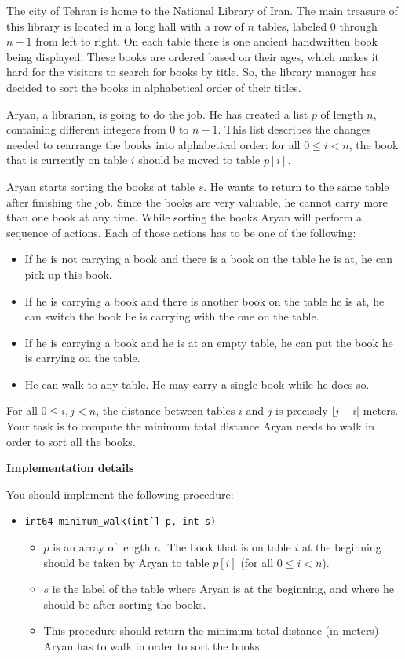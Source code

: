 The city of Tehran is home to the National Library of Iran.
The main treasure of this library is located in a long hall with a row of $n$ tables, labeled $0$ through $n-1$ from left to right.
On each table there is one ancient handwritten book being displayed.
These books are ordered based on their ages, which makes it hard for the visitors to search for books by title.
So, the library manager has decided to sort the books in alphabetical order of their titles.

Aryan, a librarian, is going to do the job.
He has created a list $p$ of length $n$, containing different integers from $0$ to $n-1$.
This list describes the changes needed to rearrange the books into alphabetical order:
for all $0 \le i < n$, the book that is currently on table $i$ should be moved to table $p[i]$.

Aryan starts sorting the books at table $s$.
He wants to return to the same table after finishing the job.
Since the books are very valuable, he cannot carry more than one book at any time.
While sorting the books Aryan will perform a sequence of actions.
Each of those actions has to be one of the following:
\begin{itemize}
\item If he is not carrying a book and there is a book on the table he is at, he can pick up this book.
\item If he is carrying a book and there is another book on the table he is at, he can switch the book he is carrying with the one on the table.
\item If he is carrying a book and he is at an empty table, he can put the book he is carrying on the table.
\item He can walk to any table. He may carry a single book while he does so.
\end{itemize}

For all $0 \le i, j < n$, the distance between tables $i$ and $j$ is precisely $|j-i|$ meters. Your task is to compute the minimum total distance Aryan needs to walk in order to sort all the books.

\textbf{Implementation details}

You should implement the following procedure:

\begin{itemize}
\item \texttt{int64 minimum\_walk(int[] p, int s)}
\begin{itemize}
\item $p$ is an array of length $n$.
The book that is on table $i$ at the beginning should be taken by Aryan to table $p[i]$ (for all $0 \le i < n$).
\item $s$ is the label of the table where Aryan is at the beginning, and where he should be after sorting the books.
\item This procedure should return the minimum total distance (in meters) Aryan has to walk in order to sort the books.
\end{itemize}
\end{itemize}

